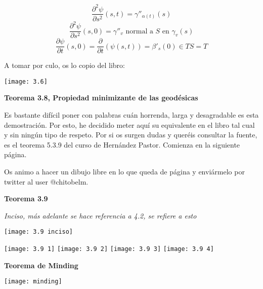 \documentclass[openany]{book}
\begin{document}
\begin{demonstration}
  $$ \dfrac{\partial ^2 \psi}{\partial s^2}(s,t) = \gamma ''_{\alpha (t)}(s)  $$
  $$ \dfrac{\partial ^2 \psi}{\partial s^2}(s,0) = \gamma ''_v \text{ normal a }S \text{ en } \gamma _v(s) $$
  $$ \dfrac{\partial \psi}{\partial t}(s,0) = \dfrac{\partial }{\partial t}\left( \psi(s,t) \right) = \beta '_s(0) \in TS=T   $$

  A tomar por culo, os lo copio del libro:
\end{demonstration}



\hspace*{-4cm}\texttt{[image: 3.6]}


\begin{center}
\textbf{Teorema 3.8, Propiedad minimizante de las geodésicas}
\end{center}

Es bastante difícil poner con palabras cuán horrenda, larga y desagradable es esta demostración. Por esto, he decidido meter aquí su equivalente en el libro tal cual y sin ningún tipo de respeto. Por si os surgen dudas y queréis consultar la fuente, es el teorema 5.3.9 del curso de Hernández Pastor. Comienza en la siguiente página.

Os animo a hacer un dibujo libre en lo que queda de página y enviármelo por twitter al user @chitobelm.




\begin{center}
\textbf{Teorema 3.9}
\end{center}


\begin{center}
\textit{Inciso, más adelante se hace referencia a 4.2, se refiere a esto}
\end{center}
\begin{center}
  \texttt{[image: 3.9 inciso]}
\end{center}
\hspace*{-4cm}\texttt{[image: 3.9 1]}
\newpage
\hspace*{-4cm}\texttt{[image: 3.9 2]}
\hspace*{-4cm}\texttt{[image: 3.9 3]}
\hspace*{-4cm}\texttt{[image: 3.9 4]}

\begin{center}
\textbf{Teorema de Minding}
\end{center}
\texttt{[image: minding]}

\end{document}
